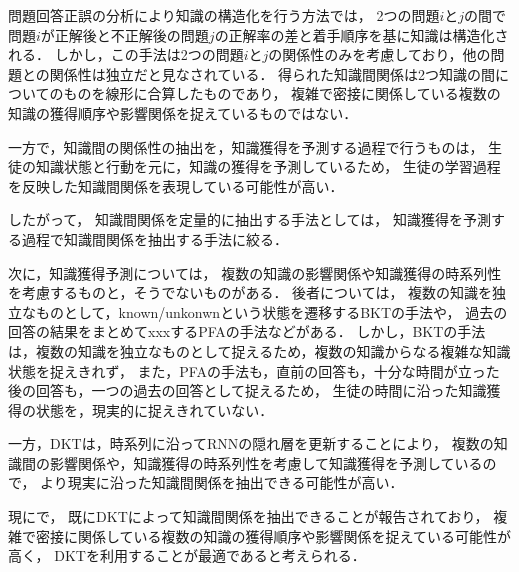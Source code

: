 問題回答正誤の分析により知識の構造化を行う方法では，%
2つの問題$i$と$j$の間で問題$i$が正解後と不正解後の問題$j$の正解率の差と着手順序を基に知識は構造化される．
しかし，この手法は2つの問題$i$と$j$の関係性のみを考慮しており，他の問題との関係性は独立だと見なされている．
得られた知識間関係は2つ知識の間についてのものを線形に合算したものであり，
複雑で密接に関係している複数の知識の獲得順序や影響関係を捉えているものではない．

一方で，知識間の関係性の抽出を，知識獲得を予測する過程で行うものは，
生徒の知識状態と行動を元に，知識の獲得を予測しているため，
生徒の学習過程を反映した知識間関係を表現している可能性が高い．

したがって，
知識間関係を定量的に抽出する手法としては，
知識獲得を予測する過程で知識間関係を抽出する手法に絞る．


次に，知識獲得予測については，
複数の知識の影響関係や知識獲得の時系列性を考慮するものと，そうでないものがある．
後者については，
複数の知識を独立なものとして，known/unkonwnという状態を遷移するBKTの手法や，
過去の回答の結果をまとめてxxxするPFAの手法などがある．
しかし，BKTの手法は，複数の知識を独立なものとして捉えるため，複数の知識からなる複雑な知識状態を捉えきれず，
また，PFAの手法も，直前の回答も，十分な時間が立った後の回答も，一つの過去の回答として捉えるため，
生徒の時間に沿った知識獲得の状態を，現実的に捉えきれていない．

一方，DKTは，時系列に沿ってRNNの隠れ層を更新することにより，
複数の知識間の影響関係や，知識獲得の時系列性を考慮して知識獲得を予測しているので，
より現実に沿った知識間関係を抽出できる可能性が高い．

現に\cite{piech2015deep}で，
既にDKTによって知識間関係を抽出できることが報告されており，%
複雑で密接に関係している複数の知識の獲得順序や影響関係を捉えている可能性が高く，
DKTを利用することが最適であると考えられる．

